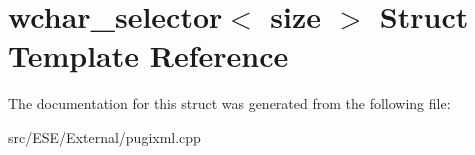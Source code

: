 \hypertarget{structwchar__selector}{\section{wchar\-\_\-selector$<$ size $>$ Struct Template Reference}
\label{structwchar__selector}
}


The documentation for this struct was generated from the following file\-:\begin{DoxyCompactItemize}
\item 
src/\-E\-S\-E/\-External/pugixml.\-cpp\end{DoxyCompactItemize}
